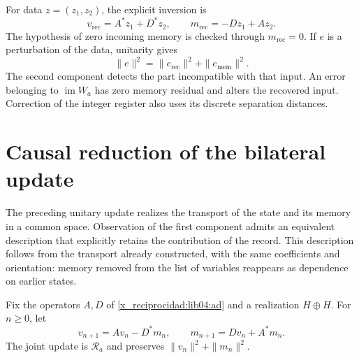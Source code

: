 For data \(z=(z_1,z_2)\), the explicit inversion is
\begin{equation}
 v_{\mathrm{rec}}=A^*z_1+D^*z_2,\qquad
 m_{\mathrm{rec}}=-Dz_1+Az_2.
 \label{x_reciprocidad:lib04:inversa-unitaria}
\end{equation}
The hypothesis of zero incoming memory is checked through
\(m_{\mathrm{rec}}=0\). If \(e\) is a perturbation of the data,
unitarity gives
\begin{equation}
 \|e\|^2=\|e_{\mathrm{rec}}\|^2+\|e_{\mathrm{mem}}\|^2.
 \label{x_reciprocidad:lib04:descomposicion-ruido}
\end{equation}
The second component detects the part incompatible with that input.
An error belonging to \(\operatorname{im}W_a\) has zero memory
residual and alters the recovered input. Correction of the integer
register also uses its discrete separation distances.


\section{Causal reduction of the bilateral update}
\label{x_reciprocidad:lib04:reduccion-causal}

The preceding unitary update realizes the transport of the state and its
memory in a common space. Observation of the first component admits an
equivalent description that explicitly retains the contribution of the
record. This description follows from the transport already constructed,
with the same coefficients and orientation: memory removed from the list
of variables reappears as dependence on earlier states.

Fix the operators \(A,D\) of \eqref{x_reciprocidad:lib04:ad} and a realization
\(H\oplus H\). For \(n\geq0\), let
\begin{equation}
 v_{n+1}=Av_n-D^*m_n,\qquad
 m_{n+1}=Dv_n+A^*m_n.
 \label{x_reciprocidad:lib04:recurrencia-memoria}
\end{equation}
The joint update is \(\mathscr R_a\) and preserves
\(\|v_n\|^2+\|m_n\|^2\).

